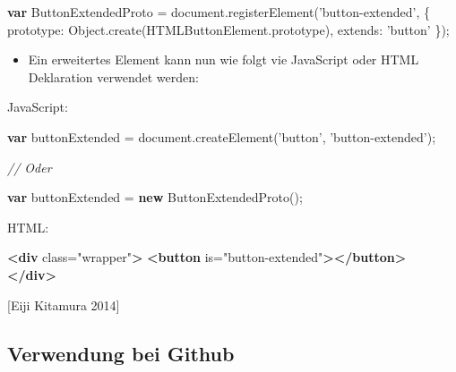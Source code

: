 \documentclass[11pt,a4paper]{report}
\newenvironment{Shaded}{}{}
\newcommand{\KeywordTok}[1]{\textcolor[rgb]{0.00,0.44,0.13}{\textbf{{#1}}}}
\newcommand{\DataTypeTok}[1]{\textcolor[rgb]{0.56,0.13,0.00}{{#1}}}
\newcommand{\StringTok}[1]{\textcolor[rgb]{0.25,0.44,0.63}{{#1}}}
\newcommand{\CommentTok}[1]{\textcolor[rgb]{0.38,0.63,0.69}{\textit{{#1}}}}
\newcommand{\OtherTok}[1]{\textcolor[rgb]{0.00,0.44,0.13}{{#1}}}
\newcommand{\VariableTok}[1]{\textcolor[rgb]{0.10,0.09,0.49}{{#1}}}
\newcommand{\OperatorTok}[1]{\textcolor[rgb]{0.40,0.40,0.40}{{#1}}}
\newcommand{\AttributeTok}[1]{\textcolor[rgb]{0.49,0.56,0.16}{{#1}}}
\newcommand{\NormalTok}[1]{{#1}}
\providecommand{\tightlist}{%
  \setlength{\itemsep}{0pt}\setlength{\parskip}{0pt}}
\begin{document}
\begin{Shaded}
\begin{Highlighting}[]
\KeywordTok{var} \NormalTok{ButtonExtendedProto }\OperatorTok{=} \VariableTok{document}\NormalTok{.}\AttributeTok{registerElement}\NormalTok{(}\StringTok{'button-extended'}\OperatorTok{,} \OperatorTok{\{}
  \DataTypeTok{prototype}\OperatorTok{:} \VariableTok{Object}\NormalTok{.}\AttributeTok{create}\NormalTok{(}\VariableTok{HTMLButtonElement}\NormalTok{.}\AttributeTok{prototype}\NormalTok{)}\OperatorTok{,}
  \DataTypeTok{extends}\OperatorTok{:} \StringTok{'button'}
\OperatorTok{\}}\NormalTok{)}\OperatorTok{;}
\end{Highlighting}
\end{Shaded}

\begin{itemize}
\tightlist
\item
  Ein erweitertes Element kann nun wie folgt vie JavaScript oder HTML
  Deklaration verwendet werden:
\end{itemize}

JavaScript:

\begin{Shaded}
\begin{Highlighting}[]
\KeywordTok{var} \NormalTok{buttonExtended  }\OperatorTok{=} \VariableTok{document}\NormalTok{.}\AttributeTok{createElement}\NormalTok{(}\StringTok{'button'}\OperatorTok{,} \StringTok{'button-extended'}\NormalTok{)}\OperatorTok{;}

\CommentTok{// Oder}

\KeywordTok{var} \NormalTok{buttonExtended }\OperatorTok{=} \KeywordTok{new} \AttributeTok{ButtonExtendedProto}\NormalTok{()}\OperatorTok{;}
\end{Highlighting}
\end{Shaded}

HTML:

\begin{Shaded}
\begin{Highlighting}[]
  \KeywordTok{<div}\OtherTok{ class=}\StringTok{"wrapper"}\KeywordTok{>}
    \KeywordTok{<button}\OtherTok{ is=}\StringTok{"button-extended"}\KeywordTok{></button>}
  \KeywordTok{</div>}
\end{Highlighting}
\end{Shaded}

{[}Eiji Kitamura 2014{]}

\subsection{Verwendung bei Github}\label{verwendung-bei-github}
\end{document}
